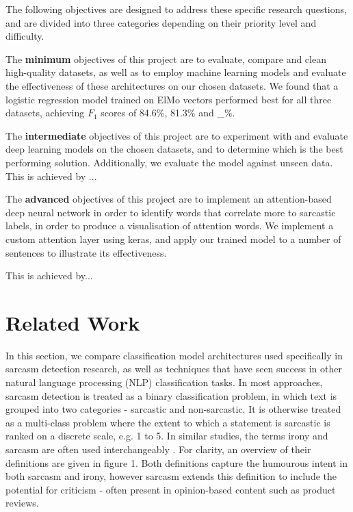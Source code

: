 \documentclass[12pt,a4paper]{article}
\begin{document}
\noindent The following objectives are designed to address these specific research questions, and are divided into three categories depending on their priority level and difficulty.

The \textbf{minimum} objectives of this project are to evaluate, compare and clean high-quality datasets, as well as to employ machine learning models and evaluate the effectiveness of these architectures on our chosen datasets. We found that a logistic regression model trained on ElMo vectors performed best for all three datasets, achieving $F_{1}$ scores of 84.6\%, 81.3\% and \_\%. 

The \textbf{intermediate} objectives of this project are to experiment with and evaluate deep learning models on the chosen datasets, and to determine which is the best performing solution. Additionally, we evaluate the model against unseen data. This is achieved by ...

The \textbf{advanced} objectives of this project are to implement an attention-based deep neural network in order to identify words that correlate more to sarcastic labels, in order to produce a visualisation of attention words. We implement a custom attention layer using keras, and apply our trained model to a number of sentences to illustrate its effectiveness.

This is achieved by...





\newpage
\section{Related Work}
\noindent In this section, we compare classification model architectures used specifically in sarcasm detection research, as well as techniques that have seen success in other natural language processing (NLP) classification tasks. In most approaches, sarcasm detection is treated as a binary classification problem, in which text is grouped into two categories - sarcastic and non-sarcastic. It is otherwise treated as a multi-class problem where the extent to which a statement is sarcastic is ranked on a discrete scale, e.g. 1 to 5. 
In similar studies, the terms irony and sarcasm are often used interchangeably \cite{tsur2010icwsm}. For clarity, an overview of their definitions are given in figure 1. Both definitions capture the humourous intent in both sarcasm and irony, however sarcasm extends this definition to include the potential for criticism - often present in opinion-based content such as product reviews.\vspace{-10pt}
\end{document}
